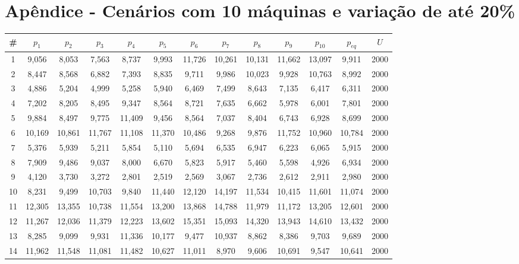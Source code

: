 \newpage
\section{Apêndice - Cenários com 10 máquinas e variação de até 20\%}\label{app:tab10machine20}
{\footnotesize\tabcolsep=3pt %
\begin{longtable}{ >{\footnotesize}ccccccccccccc}
\hline
\#  & $p_1$     & $p_2$     & $p_3$     & $p_4$     & $p_5$     & $p_6$     & $p_7$     & $p_8$     & $p_9$     & $p_{10}$    & $p_{eq}$    & $U$    \\ \hline
1   & 9,056  & 8,053  & 7,563  & 8,737  & 9,993  & 11,726 & 10,261 & 10,131 & 11,662 & 13,097 & 9,911  & 2000 \\
2   & 8,447  & 8,568  & 6,882  & 7,393  & 8,835  & 9,711  & 9,986  & 10,023 & 9,928  & 10,763 & 8,992  & 2000 \\
3   & 4,886  & 5,204  & 4,999  & 5,258  & 5,940  & 6,469  & 7,499  & 8,643  & 7,135  & 6,417  & 6,311  & 2000 \\
4   & 7,202  & 8,205  & 8,495  & 9,347  & 8,564  & 8,721  & 7,635  & 6,662  & 5,978  & 6,001  & 7,801  & 2000 \\
5   & 9,884  & 8,497  & 9,775  & 11,409 & 9,456  & 8,564  & 7,037  & 8,404  & 6,743  & 6,928  & 8,699  & 2000 \\
6   & 10,169 & 10,861 & 11,767 & 11,108 & 11,370 & 10,486 & 9,268  & 9,876  & 11,752 & 10,960 & 10,784 & 2000 \\
7   & 5,376  & 5,939  & 5,211  & 5,854  & 5,110  & 5,694  & 6,535  & 6,947  & 6,223  & 6,065  & 5,915  & 2000 \\
8   & 7,909  & 9,486  & 9,037  & 8,000  & 6,670  & 5,823  & 5,917  & 5,460  & 5,598  & 4,926  & 6,934  & 2000 \\
9   & 4,120  & 3,730  & 3,272  & 2,801  & 2,519  & 2,569  & 3,067  & 2,736  & 2,612  & 2,911  & 2,980  & 2000 \\
10  & 8,231  & 9,499  & 10,703 & 9,840  & 11,440 & 12,120 & 14,197 & 11,534 & 10,415 & 11,601 & 11,074 & 2000 \\
11  & 12,305 & 13,355 & 10,738 & 11,554 & 13,200 & 13,868 & 14,788 & 11,979 & 11,172 & 13,205 & 12,601 & 2000 \\
12  & 11,267 & 12,036 & 11,379 & 12,223 & 13,602 & 15,351 & 15,093 & 14,320 & 13,943 & 14,610 & 13,432 & 2000 \\
13  & 8,285  & 9,099  & 9,931  & 11,336 & 10,177 & 9,477  & 10,937 & 8,862  & 8,386  & 9,703  & 9,689  & 2000 \\
14  & 11,962 & 11,548 & 11,081 & 11,482 & 10,627 & 11,011 & 8,970  & 9,606  & 10,691 & 9,547  & 10,641 & 2000 \\

\end{longtable}}
